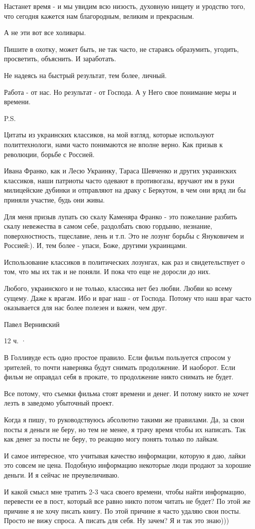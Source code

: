 Настанет время - и мы увидим всю низость, духовную нищету и уродство того, что
сегодня кажется нам благородным, великим и прекрасным.

А не эти вот все холивары.

Пишите в охотку, может быть, не так часто, не стараясь образумить, угодить, просветить, объяснить. И заработать.

Не надеясь на быстрый результат, тем более, личный.

Работа - от нас. Но результат - от Господа. А у Него свое понимание меры и
времени. 

P.S.

Цитаты из украинских классиков, на мой взгляд, которые используют
политтехнологи, нами часто понимаются не вполне верно. Как призыв к революции,
борьбе с Россией.

Ивана Франко, как и Лесю Украинку, Тараса Шевченко и других украинских
классиков, наши патриоты часто одевают в противогазы, вручают им в руки
милицейские дубинки и отправляют на драку с Беркутом, в чем они вряд ли бы
приняли участие, будь они живы.

Для меня призыв лупать сю скалу Каменяра Франко - это пожелание разбить скалу
невежества в самом себе, раздолбать свою гордыню, незнание, поверхностность,
тщеславие, лень и т.п. Это не лозунг борьбы с Януковичем и Россией:). И, тем
более - упаси, Боже, другими украинцами.

Использование классиков в политических лозунгах, как раз и свидетельствует о
том, что мы их так и не поняли. И пока что еще не доросли до них.

Любого, украинского и не только, классика нет без любви. Любви ко всему сущему.
Даже к врагам. Ибо и враг наш - от Господа. Потому что наш враг часто
оказывается для нас более полезен и важен, чем друг.

Павел Вернивский

12 ч.  · 

В Голливуде есть одно простое правило. Если фильм пользуется спросом у
зрителей, то почти наверняка будут снимать продолжение. И наоборот. Если фильм
не оправдал себя в прокате, то продолжение никто снимать не будет. 

Все потому, что съемки фильма стоят времени и денег. И потому никто не хочет
лезть в заведомо убыточный проект.

Когда я пишу, то руководствуюсь абсолютно такими же правилами. Да, за свои
посты я деньги не беру, но тем не менее, я трачу время чтобы их написать. Так
как денег за посты не беру, то реакцию могу понять только по лайкам. 

И самое интересное, что учитывая качество информации, которую я даю, лайки это
совсем не цена. Подобную информацию некоторые люди продают за хорошие деньги. И
я сейчас не преувеличиваю. 

И какой смысл мне тратить 2-3 часа своего времени, чтобы найти информацию,
перевести ее в пост, который все равно никто потом читать не будет? По этой же
причине я не хочу писать книгу. По этой причине я часто удаляю свои посты.
Просто не вижу спроса. А писать для себя. Ну зачем? Я и так это знаю)))

